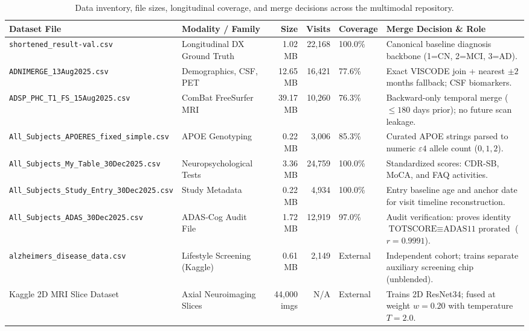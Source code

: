 \begin{table}[t]
\centering
\caption{Data inventory, file sizes, longitudinal coverage, and merge decisions across the multimodal repository.}
\label{tab:data_sources}
\small
\begin{adjustbox}{max width=\linewidth}
\begin{tabular}{lp{2.6cm}rrlp{5.0cm}}
\toprule
\textbf{Dataset File} & \textbf{Modality / Family} & \textbf{Size} & \textbf{Visits} & \textbf{Coverage} & \textbf{Merge Decision \& Role} \\
\midrule
\texttt{shortened\_result-val.csv} & Longitudinal DX Ground Truth & 1.02 MB & 22,168 & 100.0\% & Canonical baseline diagnosis backbone (1=CN, 2=MCI, 3=AD). \\
\texttt{ADNIMERGE\_13Aug2025.csv} & Demographics, CSF, PET & 12.65 MB & 16,421 & 77.6\% & Exact VISCODE join + nearest $\pm 2$ months fallback; CSF biomarkers. \\
\texttt{ADSP\_PHC\_T1\_FS\_15Aug2025.csv} & ComBat FreeSurfer MRI & 39.17 MB & 10,260 & 76.3\% & Backward-only temporal merge ($\le 180$ days prior); no future scan leakage. \\
\texttt{All\_Subjects\_APOERES\_fixed\_simple.csv} & APOE Genotyping & 0.22 MB & 3,006 & 85.3\% & Curated APOE strings parsed to numeric $\varepsilon4$ allele count ($0, 1, 2$). \\
\texttt{All\_Subjects\_My\_Table\_30Dec2025.csv} & Neuropsychological Tests & 3.36 MB & 24,759 & 100.0\% & Standardized scores: CDR-SB, MoCA, and FAQ activities. \\
\texttt{All\_Subjects\_Study\_Entry\_30Dec2025.csv} & Study Metadata & 0.22 MB & 4,934 & 100.0\% & Entry baseline age and anchor date for visit timeline reconstruction. \\
\texttt{All\_Subjects\_ADAS\_30Dec2025.csv} & ADAS-Cog Audit File & 1.72 MB & 12,919 & 97.0\% & Audit verification: proves identity $\text{TOTSCORE} \equiv \text{ADAS11 prorated}$ ($r=0.9991$). \\
\texttt{alzheimers\_disease\_data.csv} & Lifestyle Screening (Kaggle) & 0.61 MB & 2,149 & External & Independent cohort; trains separate auxiliary screening chip (unblended). \\
Kaggle 2D MRI Slice Dataset & Axial Neuroimaging Slices & 44,000 imgs & N/A & External & Trains 2D ResNet34; fused at weight $w=0.20$ with temperature $T=2.0$. \\
\bottomrule
\end{tabular}
\end{adjustbox}
\end{table}
